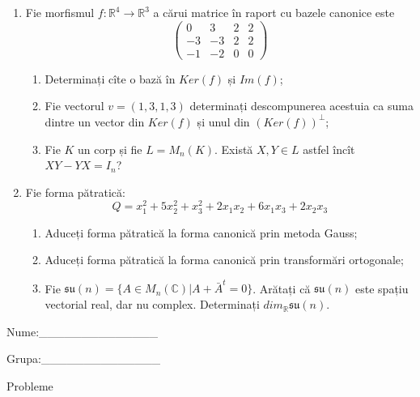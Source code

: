 \documentclass{article}
\begin{document}
\begin{enumerate}
 \item Fie morfismul $f:\mathbb{R}^4 \to \mathbb{R}^3$ a cărui matrice în raport cu bazele canonice este
$$\begin{pmatrix}
0&3&2&2\\
-3&-3&2&2\\
-1&-2&0&0
\end{pmatrix}$$

\begin{enumerate}
\item Determinați cîte o bază în $Ker(f)$ și $Im(f)$;
\item Fie vectorul $v=(1,3,1,3)$ determinați descompunerea acestuia ca suma dintre un vector din $Ker(f)$ și unul din $(Ker(f))^\perp$;
\item Fie $K$ un corp și fie $L=M_n(K)$. Există $X,Y \in L$ astfel încît $XY-YX=I_n$?  
\end{enumerate}
\item Fie forma pătratică:
$$Q= x_1^2+5x_2^2+x_3^2+2x_1x_2+6x_1x_3+2x_2x_3$$

\begin{enumerate}
\item Aduceți forma pătratică la forma canonică prin metoda Gauss;
\item Aduceți forma pătratică la forma canonică prin transformări ortogonale;
\item Fie $\mathfrak{su}(n)=\{ A \in M_n(\mathbb{C}) | A+\bar{A}^t=0\}$. Arătați că $\mathfrak{su}(n)$ este spațiu vectorial real, dar nu complex.
Determinați $dim_{\mathbb{R}}\mathfrak{su}(n)$.
\end{enumerate}
\end{enumerate}
\newpage
\begin{flushright}
Nume:\_\_\_\_\_\_\_\_\_\_\_\_\_\_
 
 
Grupa:\_\_\_\_\_\_\_\_\_\_\_\_\_\_
\end{flushright}
\begin{center}
\vspace{2cm}
{\Large Probleme}
\vspace{2cm}
\end{center}
\end{document}
